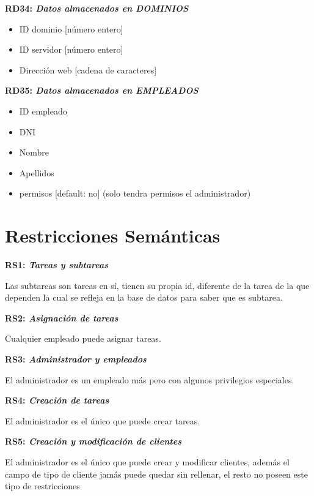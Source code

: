 \documentclass[paper=a4, fontsize=11pt, spanish]{scrartcl}
\begin{document}
\setlength{\parindent}{0em}
\textbf{RD34: \textit{Datos almacenados en DOMINIOS}}
\setlength{\parindent}{2em}
\begin{itemize}
  \item ID dominio [número entero]
  \item ID servidor [número entero]
  \item Dirección web [cadena de caracteres]
\end{itemize}

\setlength{\parindent}{0em}
\textbf{RD35: \textit{Datos almacenados en EMPLEADOS}}
\setlength{\parindent}{2em}
\begin{itemize}
  \item ID empleado
  \item DNI
  \item Nombre
  \item Apellidos
  \item permisos [default: no] (solo tendra permisos el administrador)
\end{itemize}

\section{Restricciones Semánticas}
\setlength{\parindent}{0em}
\textbf{RS1: \textit{Tareas y subtareas}}
\setlength{\parindent}{2em}

Las subtareas son tareas en sí, tienen su propia id, diferente de la tarea de la que dependen la cual se refleja en la base de datos para saber que es subtarea.

\setlength{\parindent}{0em}
\textbf{RS2: \textit{Asignación de tareas}}
\setlength{\parindent}{2em}

Cualquier empleado puede asignar tareas.

\setlength{\parindent}{0em}
\textbf{RS3: \textit{Administrador y empleados}}
\setlength{\parindent}{2em}

El administrador es un empleado más pero con algunos privilegios especiales.

\setlength{\parindent}{0em}
\textbf{RS4: \textit{Creación de tareas}}
\setlength{\parindent}{2em}

El administrador es el único que puede crear tareas.

\setlength{\parindent}{0em}
\textbf{RS5: \textit{Creación y modificación de clientes}}
\setlength{\parindent}{2em}

El administrador es el único que puede crear y modificar clientes, además el campo de tipo de cliente jamás puede quedar sin rellenar, el resto no poseen este tipo de restricciones
\end{document}
